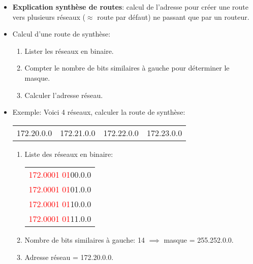 \documentclass[a4paper]{article}
\begin{document}
\begin{itemize}
    \item \textbf{Explication synthèse de routes}: calcul de l’adresse pour créer une route vers plusieurs réseaux ($ \approx $ route par défaut) ne passant que par un
    routeur.
    \item Calcul d'une route de synthèse:
    \begin{enumerate}
        \item Lister les réseaux en binaire.
        \item Compter le nombre de bits similaires à gauche pour déterminer le masque.
        \item Calculer l’adresse réseau.
    \end{enumerate}
    \item Exemple: Voici 4 réseaux, calculer la route de synthèse:
    \begin{center}
        \begin{tabular}{c|c|c|c}
            172.20.0.0 & 172.21.0.0 & 172.22.0.0 & 172.23.0.0
        \end{tabular}
    \end{center}
    \begin{example}
        \begin{enumerate}
            \item Liste des réseaux en binaire:
            \begin{center}
                \begin{tabular}{c}
                    \textcolor{red}{172.0001 01}00.0.0 \\
                    \textcolor{red}{172.0001 01}01.0.0 \\
                    \textcolor{red}{172.0001 01}10.0.0 \\
                    \textcolor{red}{172.0001 01}11.0.0 \\
                \end{tabular}
            \end{center}
            \item Nombre de bits similaires à gauche: 14 $ \implies $ masque = 255.252.0.0.
            \item Adresse réseau = 172.20.0.0.
        \end{enumerate}
    \end{example}
\end{itemize}
\end{document}
